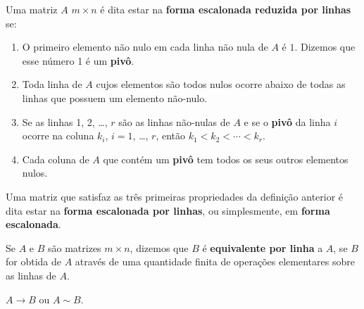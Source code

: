 \documentclass{beamer}
\begin{document}
    \begin{frame}
        \begin{definicao}\label{linhareduzida}
            Uma matriz $A$ $m \times n$ \'e dita estar na \textbf{forma escalonada reduzida por linhas} se:
            \begin{enumerate}[label={\roman*})]
                \item O primeiro elemento n\~ao nulo em cada linha n\~ao nula de $A$ \'e $1$. Dizemos que esse número 1 é um \textbf{pivô}.

                \vspace{.3cm}

                \item Toda linha de $A$ cujos elementos s\~ao todos nulos ocorre abaixo de todas as linhas que possuem um elemento n\~ao-nulo.
 
                \vspace{.3cm}

                \item Se as linhas 1, 2, \dots, $r$ s\~ao as linhas n\~ao-nulas de $A$ e se o \textbf{pivô} da linha $i$ ocorre na coluna $k_i$, $i = 1$, \dots, $r$, ent\~ao $k_1 < k_2 < \cdots < k_r$.
 
                \vspace{.3cm}

                \item Cada coluna de $A$ que cont\'em um \textbf{pivô} tem todos os seus outros elementos nulos.
            \end{enumerate}
        \end{definicao}
    \end{frame}

    \begin{frame}
        \begin{observacao}
            Uma matriz que satisfaz as três primeiras propriedades da definição anterior é dita estar na \textbf{forma escalonada por linhas}, ou simplesmente, em \textbf{forma escalonada}.
        \end{observacao}
    \end{frame}

    \begin{frame}
        \begin{definicao}
	    Se $A$ e $B$ s\~ao matrizes $m \times n$, dizemos que $B$ \'e \textbf{equivalente por linha} a $A$, se $B$ for obtida de $A$ atrav\'es de uma quantidade finita de opera\c{c}\~oes elementares sobre as linhas de $A$.
        \end{definicao}
        
        \vspace{.6cm}

        \begin{notacao}
	    $A \rightarrow B$ ou $A \sim B$.
        \end{notacao}
    \end{frame}
\end{document}
